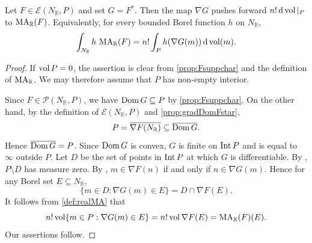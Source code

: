 \begin{lemma}\label{lma:realMA_Legendre_pushforward}
    Let $F\in \mathcal{E}(N_{\mathbb{R}},P)$ and set $G=F^*$. Then the map $\nabla G$ pushes forward $n!\,\mathrm{d}\operatorname{vol}|_{P}$ to $\operatorname{MA}_{\mathbb R}(F)$. Equivalently, for every bounded Borel function $h$ on $N_{\mathbb R}$,
    \[
        \int_{N_{\mathbb R}} h\,\operatorname{MA}_{\mathbb R}(F)= n!\int_P h(\nabla G(m))\,\mathrm{d}\operatorname{vol}(m).
    \]
\end{lemma}
\begin{proof}
    If $\operatorname{vol} P=0$, the assertion is clear from \cref{prop:Fsuppchar} and the definition of $\operatorname{MA}_{\mathbb R}$. We may therefore assume that $P$ has non-empty interior.

    Since $F\in \mathcal P(N_{\mathbb R},P)$, we have $\operatorname{Dom} G\subseteq P$ by \cref{prop:Fsuppchar}. On the other hand, by the definition of $\mathcal E(N_{\mathbb R},P)$ and \cref{prop:gradDomFstar},
    \[
        P=\overline{\nabla F(N_{\mathbb R})}\subseteq \overline{\operatorname{Dom} G}.
    \]
    Hence $\overline{\operatorname{Dom} G}=P$. Since $\operatorname{Dom} G$ is convex, $G$ is finite on $\operatorname{Int} P$ and is equal to $\infty$ outside $P$. Let $D$ be the set of points in $\operatorname{Int} P$ at which $G$ is differentiable. By \cite[Theorem~25.5]{Roc70}, $P\setminus D$ has measure zero. By \cite[Theorem~23.5]{Roc70}, $m\in\nabla F(n)$ if and only if $n\in\nabla G(m)$. Hence for any Borel set $E\subseteq N_{\mathbb R}$,
    \[
        \{m\in D:\nabla G(m)\in E\}=D\cap \nabla F(E).
    \]
    It follows from \cref{def:realMA} that
    \[
        n!\operatorname{vol} \{m\in P:\nabla G(m)\in E\}=n!\operatorname{vol} \nabla F(E)=\operatorname{MA}_{\mathbb R}(F)(E).
    \]
    Our assertions follow.
\end{proof}

